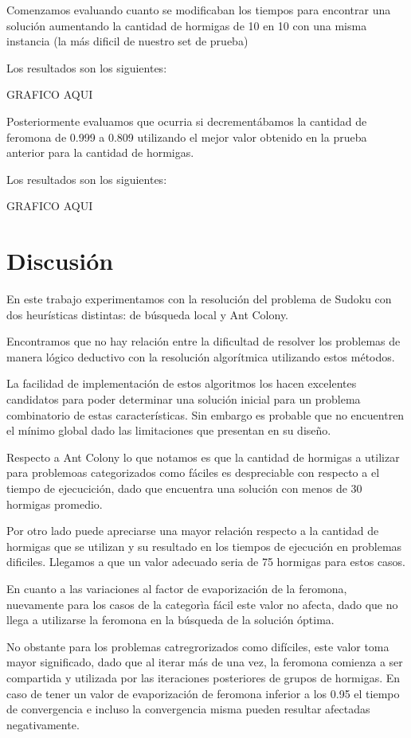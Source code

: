 \documentclass[a4paper,spanish]{article}
\begin{document}
Comenzamos evaluando cuanto se modificaban los tiempos para encontrar una solución aumentando 
la cantidad de hormigas de 10 en 10 con una misma instancia (la más dificil de nuestro set de prueba)

Los resultados son los siguientes:

GRAFICO AQUI

Posteriormente evaluamos que ocurria si decrementábamos la cantidad de feromona de 0.999 a 0.809 utilizando
el mejor valor obtenido en la prueba anterior para la cantidad de hormigas.

Los resultados son los siguientes:

GRAFICO AQUI


\section{Discusión}

En este trabajo experimentamos con la resolución del problema de Sudoku con dos
heurísticas distintas: de búsqueda local y Ant Colony.


Encontramos que no hay relación entre la dificultad de resolver los problemas de
manera lógico deductivo con la resolución algorítmica utilizando estos métodos.

La facilidad de implementación de estos algoritmos los hacen excelentes
candidatos para poder determinar una solución inicial para un problema
combinatorio de estas características. Sin embargo es probable que no encuentren
el mínimo global dado las limitaciones que presentan en su diseño.


Respecto a Ant Colony lo que notamos es que la cantidad de hormigas a utilizar para problemoas categorizados como
fáciles es despreciable con respecto a el tiempo de ejecucición, dado que encuentra una solución con
menos de 30 hormigas promedio.

Por otro lado puede apreciarse una mayor relación respecto a la cantidad de hormigas que se 
utilizan y su resultado en los tiempos de ejecución en problemas dificiles. Llegamos a que un valor
adecuado seria de 75 hormigas para estos casos.

En cuanto a las variaciones al factor de evaporización de la feromona, nuevamente para los casos de la categorìa fácil
este valor no afecta, dado que no llega a utilizarse la feromona en la búsqueda de la solución óptima.

No obstante para los problemas catregrorizados como difíciles, este valor toma mayor significado, dado que al iterar más 
de una vez, la feromona comienza a ser compartida y utilizada por las iteraciones posteriores de grupos
de hormigas. En caso de tener un valor de evaporización de feromona inferior a los 0.95 el tiempo de
convergencia e incluso la convergencia misma pueden resultar afectadas negativamente.
\end{document}
